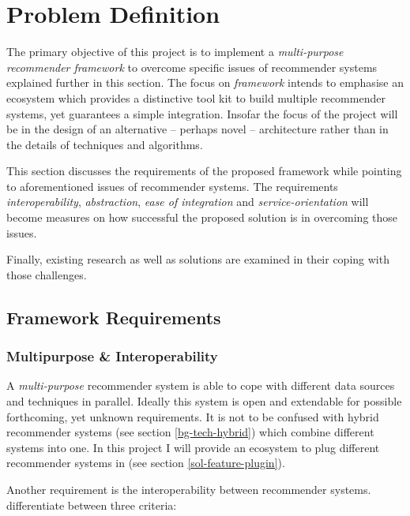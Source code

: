 \chapter{Problem Definition}
\label{problem}

The primary objective of this project is to implement a \textit{multi-purpose recommender framework} to overcome specific issues of recommender systems explained further in this section. The focus on \emph{framework} intends to emphasise an ecosystem which provides a distinctive tool kit to build multiple recommender systems, yet guarantees a simple integration. Insofar the focus of the project will be in the design of an alternative -- perhaps novel -- architecture rather than in the details of techniques and algorithms.

This section discusses the requirements of the proposed framework while pointing to aforementioned issues of recommender systems. The requirements \emph{interoperability}, \emph{abstraction}, \emph{ease of integration} and \emph{service-orientation} will become measures on how successful the proposed solution is in overcoming those issues.

Finally, existing research as well as solutions are examined in their coping with those challenges.



\section{Framework Requirements}

\subsection{Multipurpose \& Interoperability}

A \emph{multi-purpose} recommender system is able to cope with different data sources and techniques in parallel. Ideally this system is open and extendable for possible forthcoming, yet unknown requirements. It is not to be confused with hybrid recommender systems (see section \ref{bg-tech-hybrid}) which combine different systems into one. In this project I will provide an ecosystem to plug different recommender systems in (see section \ref{sol-feature-plugin}).

Another requirement is the interoperability between recommender systems. \citet{manouselis07} differentiate between three criteria:

